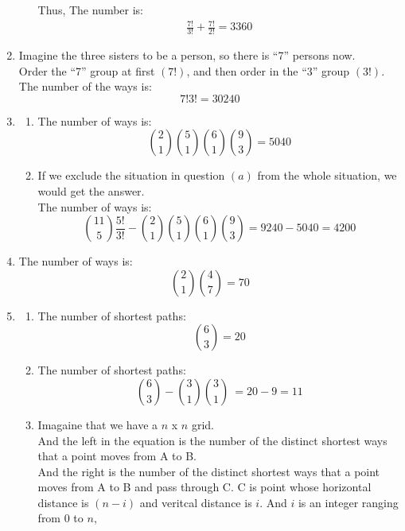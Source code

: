 \documentclass{article}
\begin{document}
\begin{enumerate}
\begin{enumerate}
            Thus, The number is:
            \begin{align*}
                \frac{7!}{3!} + \frac{7!}{2!} = 3360
            \end{align*}
        \end{enumerate}
        \item 
        Imagine the three sisters to be a person,
        so there is ``7'' persons now.\\
        Order the ``7'' group at first \((7!)\),
        and then order in the ``3'' group \((3!)\).\\
        The number of the ways is:
        \[7!3! = 30240\]
        \item 
        \begin{enumerate}
            \item The number of ways is:
            \[\binom{2}{1} \binom{5}{1} \binom{6}{1} \binom{9}{3} = 5040\]
            \item If we exclude the situation in question \((a)\) from the whole situation,
            we would get the answer.\\
            The number of ways is:
            \[\binom{11}{5} \frac{5!}{3!} - 
            \binom{2}{1} \binom{5}{1} \binom{6}{1} \binom{9}{3} = 9240 - 5040 = 4200\]
        \end{enumerate}
        \item The number of ways is: 
            \[\binom{2}{1} \binom{4}{7} = 70\]
        \item 
        \begin{enumerate}
            \item The number of shortest paths:
            \[\binom{6}{3} = 20\]
            \item The number of shortest paths:
            \[\binom{6}{3} - \binom{3}{1} \binom{3}{1}\ = 20 - 9 = 11\]
            \item 
                Imagaine that we have a $n$ x $n$ grid.\\
                And the left in the equation is the number of the distinct shortest ways that a point moves from A to B.\\
                And the right is the number of the distinct shortest ways that a point moves from A to B and pass through C.
                C is point whose horizontal distance is $(n - i)$ and veritcal distance is $i$. And $i$ is an integer ranging from 0 to $n$,

\end{enumerate}
\end{enumerate}
\end{document}
